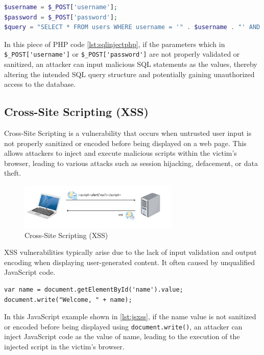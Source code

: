 \documentclass[journal]{IEEEtran}
\begin{document}
\begin{lstlisting}[caption={PHP code SQL Injection},label={lst:sqlinjectphp},
  language=PHP,breaklines=true]
$username = $_POST['username'];
$password = $_POST['password'];
$query = "SELECT * FROM users WHERE username = '" . $username . "' AND password = '" . $password . "'";
\end{lstlisting}

In this piece of PHP code \ref{lst:sqlinjectphp}, if the parameters which in \verb|$_POST['username']| or \verb|$_POST['password']| are not properly validated or sanitized, an attacker can input malicious SQL statements as the values, thereby altering the intended SQL query structure and potentially gaining unauthorized access to the database.

\subsection{Cross-Site Scripting (XSS)}
Cross-Site Scripting is a vulnerability that occurs when untrusted user input is not properly sanitized or encoded before being displayed on a web page. This allows attackers to inject and execute malicious scripts within the victim's browser, leading to various attacks such as session hijacking, defacement, or data theft. 

\begin{figure}[ht]
  \centering
  \includegraphics[width=3in]{figures/xss.png}
  \caption{Cross-Site Scripting (XSS)}
  \label{fig:xss}
  \end{figure}

XSS vulnerabilities typically arise due to the lack of input validation and output encoding when displaying user-generated content. It often caused by unqualified JavaScript code.

\begin{lstlisting}[caption={JavaScript Cross-Site Scripting (XSS)},label={lst:jsxss},language=HTML,breaklines=true]
var name = document.getElementById('name').value;
document.write("Welcome, " + name);
\end{lstlisting}

In this JavaScript example shown in \ref{lst:jsxss}, if the name value is not sanitized or encoded before being displayed using \verb|document.write()|, an attacker can inject JavaScript code as the value of name, leading to the execution of the injected script in the victim's browser.
\end{document}
